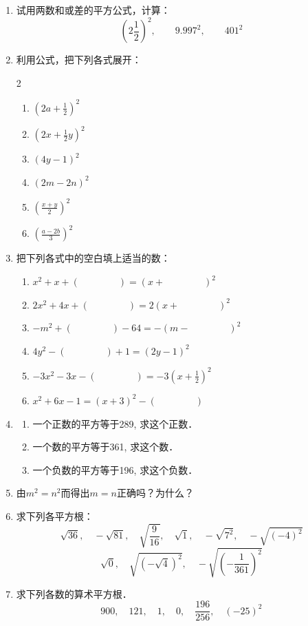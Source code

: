 \begin{enumerate}
    \item 试用两数和或差的平方公式，计算：
\[\left(2\frac{1}{2}\right)^2,\qquad 9.997^2,\qquad 401^2\]
    \item 利用公式，把下列各式展开：
\begin{multicols}{2}
\begin{enumerate}
    \item $\left(2a+\frac{1}{2}\right)^2$
    \item $\left(2x+\frac{1}{2}y\right)^2$
    \item $(4y-1)^2$
    \item $(2m-2n)^2$
    \item $\left(\frac{x+y}{2}\right)^2$
    \item $\left(\frac{a-2b}{3}\right)^2$
\end{enumerate}
\end{multicols}
    \item 把下列各式中的空白填上适当的数：
\begin{enumerate}
    \item $x^2+x+(\qquad\qquad  )=(x+\qquad\qquad  )^2$
    \item $2x^2+4x+(\qquad\qquad   )=2(x+\qquad\qquad  )^2$
    \item $-m^2+(\qquad\qquad   )-64=-(m-\qquad\qquad  )^2$
    \item $4y^2-(\qquad\qquad  )+1=(2y-1)^2$
    \item $-3x^2-3x-(\qquad\qquad  )=-3\left(x+\frac{1}{2}\right)^2$
    \item $x^2+6x-1=(x+3)^2-(\qquad\qquad   )$
\end{enumerate}
    \item \begin{enumerate}
        \item 一个正数的平方等于289, 求这个正数．
        \item 一个数的平方等于361, 求这个数．
        \item 一个负数的平方等于196, 求这个负数．
    \end{enumerate}
    
\item 由$m^2=n^2$而得出$m=n$正确吗？为什么？
\item 求下列各平方根：
\[\sqrt{36},\quad -\sqrt{81},\quad \sqrt{\frac{9}{16}},\quad \sqrt{1},\quad -\sqrt{7^2},\quad -\sqrt{(-4)^2}\]
\[\sqrt{0},\quad \sqrt{(-\sqrt{4})^2},\quad -\sqrt{\left(-\frac{1}{361}\right)^2}\]
\item 求下列各数的算术平方根．
\[900,\quad 121,\quad 1,\quad 0,\quad \frac{196}{256},\quad (-25)^2\]


\end{enumerate}
